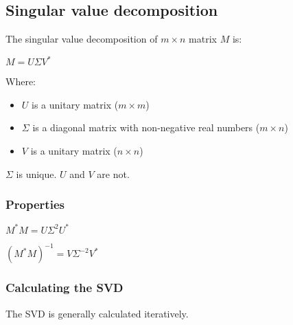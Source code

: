 
\subsection{Singular value decomposition}

The singular value decomposition of \(m\times n\) matrix \(M\) is:

\(M=U\Sigma V^* \)

Where:

\begin{itemize}
\item \(U\) is a unitary matrix (\(m\times m\))
\item \(\Sigma \) is a diagonal matrix with non-negative real numbers (\(m\times n\))
\item \(V\) is a unitary matrix (\(n\times n\))
\end{itemize}

\(\Sigma \) is unique. \(U\) and \(V\) are not.

\subsubsection{Properties}

\(M^*M=U\Sigma^2 U^*\)

\((M^*M)^{-1}=V\Sigma^{-2} V^*\)

\subsubsection{Calculating the SVD}

The SVD is generally calculated iteratively.

